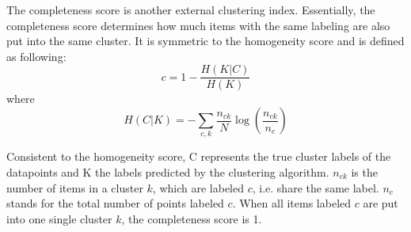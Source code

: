 The completeness score is another external clustering index. Essentially, the completeness score determines how much items with the same labeling are also put into the same cluster. It is symmetric to the homogeneity score and is defined as following:
$$c = 1 - \frac{H(K|C)}{H(K)}$$
where
$$H(C|K) = - \sum_{c,k} \frac{n_{ck}}{N}\log\left(\frac{n_{ck}}{n_c}\right)$$

Consistent to the homogeneity score, C represents the true cluster labels of the datapoints and K the labels predicted by the clustering algorithm. $n_{ck}$ is the number of items in a cluster $k$, which are labeled $c$, i.e. share the same label. $n_c$ stands for the total number of points labeled $c$.
When all items labeled $c$ are put into one single cluster $k$, the completeness score is 1.